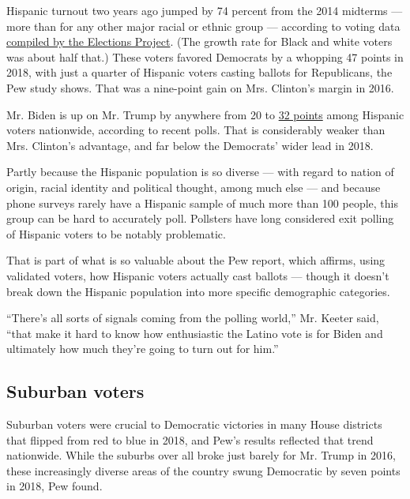 Hispanic turnout two years ago jumped by 74 percent from the 2014
midterms --- more than for any other major racial or ethnic group ---
according to voting data
\href{http://www.electproject.org/home/voter-turnout/demographics}{compiled
by the Elections Project}. (The growth rate for Black and white voters
was about half that.) These voters favored Democrats by a whopping 47
points in 2018, with just a quarter of Hispanic voters casting ballots
for Republicans, the Pew study shows. That was a nine-point gain on Mrs.
Clinton's margin in 2016.

Mr. Biden is up on Mr. Trump by anywhere from 20 to
\href{https://www.suffolk.edu/-/media/suffolk/documents/academics/research-at-suffolk/suprc/polls/national/2020/9_4_2020_tables_pdftxt_1.pdf?la=en\&hash=D3CA68E8C4C8511FBE7BE4A26D60C717C859A38B}{32
points} among Hispanic voters nationwide, according to recent polls.
That is considerably weaker than Mrs. Clinton's advantage, and far below
the Democrats' wider lead in 2018.

Partly because the Hispanic population is so diverse --- with regard to
nation of origin, racial identity and political thought, among much else
--- and because phone surveys rarely have a Hispanic sample of much more
than 100 people, this group can be hard to accurately poll. Pollsters
have long considered exit polling of Hispanic voters to be notably
problematic.

That is part of what is so valuable about the Pew report, which affirms,
using validated voters, how Hispanic voters actually cast ballots ---
though it doesn't break down the Hispanic population into more specific
demographic categories.

``There's all sorts of signals coming from the polling world,'' Mr.
Keeter said, ``that make it hard to know how enthusiastic the Latino
vote is for Biden and ultimately how much they're going to turn out for
him.''

\hypertarget{suburban-voters}{%
\subsection{Suburban voters}\label{suburban-voters}}

Suburban voters were crucial to Democratic victories in many House
districts that flipped from red to blue in 2018, and Pew's results
reflected that trend nationwide. While the suburbs over all broke just
barely for Mr. Trump in 2016, these increasingly diverse areas of the
country swung Democratic by seven points in 2018, Pew found.

